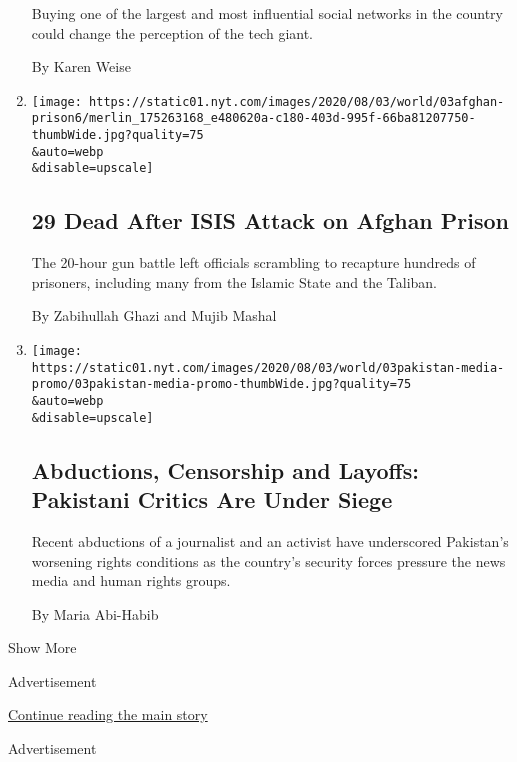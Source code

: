 \begin{enumerate}
  Buying one of the largest and most influential social networks in the
  country could change the perception of the tech giant.

  By Karen Weise
\item
  \href{/2020/08/03/world/asia/afghanistan-prison-isis-taliban.html}{}

  \texttt{[image: https://static01.nyt.com/images/2020/08/03/world/03afghan-prison6/merlin\_175263168\_e480620a-c180-403d-995f-66ba81207750-thumbWide.jpg?quality=75\\\&auto=webp\\\&disable=upscale]}

  \hypertarget{29-dead-after-isis-attack-on-afghan-prison}{%
  \subsection{29 Dead After ISIS Attack on Afghan
  Prison}\label{29-dead-after-isis-attack-on-afghan-prison}}

  The 20-hour gun battle left officials scrambling to recapture hundreds
  of prisoners, including many from the Islamic State and the Taliban.

  By Zabihullah Ghazi and Mujib Mashal
\item
  \href{/2020/08/03/world/asia/pakistan-media-abductions.html}{}

  \texttt{[image: https://static01.nyt.com/images/2020/08/03/world/03pakistan-media-promo/03pakistan-media-promo-thumbWide.jpg?quality=75\\\&auto=webp\\\&disable=upscale]}

  \hypertarget{abductions-censorship-and-layoffs-pakistani-critics-are-under-siege}{%
  \subsection{Abductions, Censorship and Layoffs: Pakistani Critics Are
  Under
  Siege}\label{abductions-censorship-and-layoffs-pakistani-critics-are-under-siege}}

  Recent abductions of a journalist and an activist have underscored
  Pakistan's worsening rights conditions as the country's security
  forces pressure the news media and human rights groups.

  By Maria Abi-Habib
\end{enumerate}

Show More

Advertisement

\protect\hyperlink{after-mid1}{Continue reading the main story}

Advertisement


